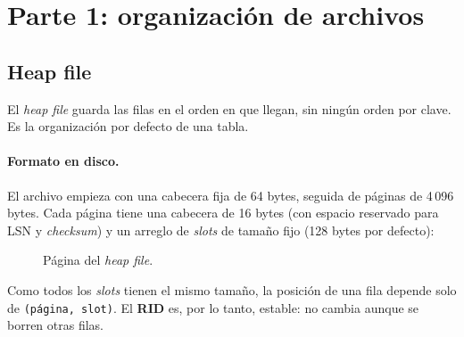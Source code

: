 \documentclass[11pt,a4paper]{article}
\begin{document}
\section{Parte 1: organización de archivos}

\subsection{Heap file}

El \emph{heap file} guarda las filas en el orden en que llegan, sin ningún orden por clave. Es la organización por defecto de una tabla.

\paragraph{Formato en disco.} El archivo empieza con una cabecera fija de 64 bytes, seguida de páginas de 4\,096 bytes. Cada página tiene una cabecera de 16 bytes (con espacio reservado para LSN y \emph{checksum}) y un arreglo de \emph{slots} de tamaño fijo (128 bytes por defecto):

\begin{figure}[H]
  \centering
  \caption{Página del \emph{heap file}.}
\end{figure}

Como todos los \emph{slots} tienen el mismo tamaño, la posición de una fila depende solo de \texttt{(página, slot)}. El \textbf{RID} es, por lo tanto, estable: no cambia aunque se borren otras filas.
\end{document}
